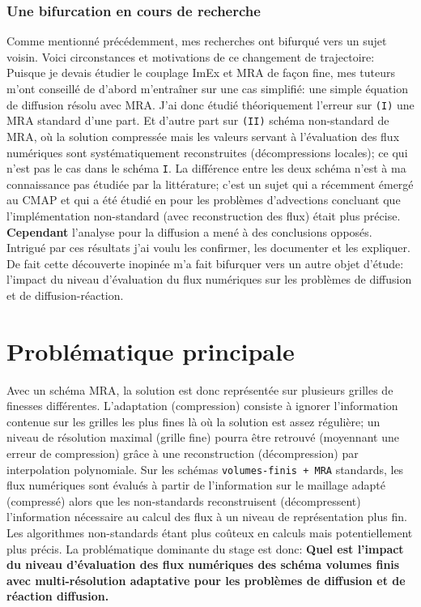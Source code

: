     \subsubsection{Une bifurcation en cours de recherche}
        Comme mentionné précédemment, mes recherches ont bifurqué vers un sujet voisin. Voici circonstances et motivations de ce changement de trajectoire:
        Puisque je devais étudier le couplage ImEx et MRA de façon fine, mes tuteurs m'ont conseillé 
        de d'abord m'entraîner sur une cas simplifié: une simple équation de diffusion résolu avec MRA.
        J'ai donc étudié théoriquement l'erreur sur \texttt{(I)} une MRA standard d'une part. Et d'autre part sur \texttt{(II)} schéma non-standard de MRA, où la solution compressée mais les valeurs servant à l'évaluation des flux numériques sont systématiquement reconstruites (décompressions locales); ce qui n'est pas le cas dans le schéma \texttt{I}.
        La différence entre les deux schéma n'est à ma connaissance pas étudiée par la littérature;
        c'est un sujet qui a récemment émergé au CMAP et qui a été étudié en \cite{belloti_et_al_2025} pour les problèmes d'advections 
        concluant que l'implémentation non-standard (avec reconstruction des flux) était plus précise.
        \textbf{Cependant} l'analyse pour la diffusion a mené à des conclusions opposés.
        Intrigué par ces résultats j'ai voulu les confirmer, les documenter et les expliquer.
        De fait cette découverte inopinée m'a fait bifurquer vers un autre objet d'étude: 
        l'impact du niveau d'évaluation du flux numériques sur les problèmes de diffusion et de diffusion-réaction.
    \newpage
    \section{Problématique principale}
    Avec un schéma MRA, la solution est donc représentée sur plusieurs grilles de finesses différentes.
    L'adaptation (compression) consiste à ignorer l'information contenue sur les grilles les plus fines là où la solution est assez régulière;
    un niveau de résolution maximal (grille fine) pourra être retrouvé (moyennant une erreur de compression) grâce à une reconstruction (décompression) par 
    interpolation polynomiale.
    Sur les schémas \texttt{volumes-finis + MRA} standards, les flux numériques sont évalués à partir de l'information sur le maillage adapté (compressé) alors
    que les non-standards reconstruisent (décompressent) l'information nécessaire au calcul des flux à un niveau de représentation plus fin. Les algorithmes non-standards 
    étant plus coûteux en calculs mais potentiellement plus précis.
    La problématique dominante du stage est donc: \textbf{Quel est l'impact du niveau d'évaluation des flux numériques des schéma volumes finis avec multi-résolution adaptative
    pour les problèmes de diffusion et de réaction diffusion.}